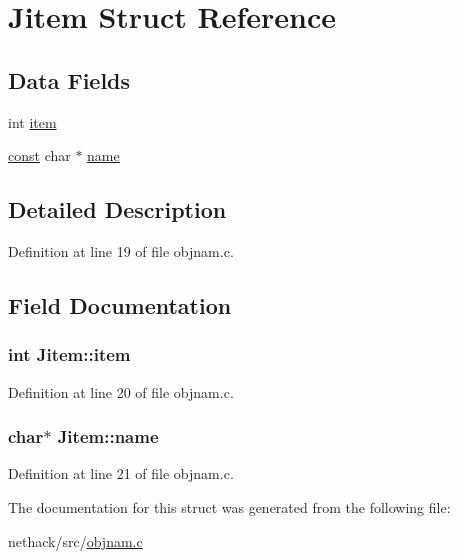 \hypertarget{structJitem}{\section{Jitem Struct Reference}
\label{structJitem}
}
\subsection*{Data Fields}
\begin{DoxyCompactItemize}
\item 
int \hyperlink{structJitem_aa42f715c21e7085e06d1c5660e531bf2}{item}
\item 
\hyperlink{tradstdc_8h_a2c212835823e3c54a8ab6d95c652660e}{const} char $\ast$ \hyperlink{structJitem_a1e39fc85263a1b819c23c872614a7d63}{name}
\end{DoxyCompactItemize}


\subsection{Detailed Description}


Definition at line 19 of file objnam.\+c.



\subsection{Field Documentation}
\hypertarget{structJitem_aa42f715c21e7085e06d1c5660e531bf2}{
\subsubsection[{item}]{\setlength{\rightskip}{0pt plus 5cm}int Jitem\+::item}}\label{structJitem_aa42f715c21e7085e06d1c5660e531bf2}


Definition at line 20 of file objnam.\+c.

\hypertarget{structJitem_a1e39fc85263a1b819c23c872614a7d63}{
\subsubsection[{name}]{ char$\ast$ Jitem\+::name}}\label{structJitem_a1e39fc85263a1b819c23c872614a7d63}


Definition at line 21 of file objnam.\+c.



The documentation for this struct was generated from the following file\+:\begin{DoxyCompactItemize}
\item 
nethack/src/\hyperlink{objnam_8c}{objnam.\+c}\end{DoxyCompactItemize}
